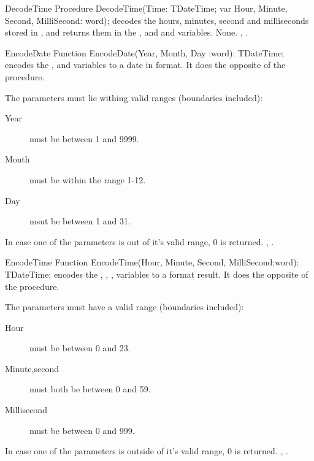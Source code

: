 


\begin{procedure}{DecodeTime}
\Declaration
Procedure DecodeTime(Time: TDateTime; var Hour, Minute, Second, MilliSecond: word);
\Description
{} decodes the hours, minutes, second and milliseconds stored
in , and returns them in the ,  and
 and  variables.
\Errors
None.
\SeeAlso
{}, .
\end{procedure}



\begin{function}{EncodeDate}
\Declaration
Function EncodeDate(Year, Month, Day :word): TDateTime;
\Description
{} encodes the ,  and  variables to
a date in  format. It does the opposite of the
 procedure.

The parameters must lie withing valid ranges (boundaries included):
\begin{description}
\item[Year] must be between 1 and 9999.
\item[Month] must be within the range 1-12.
\item[Day] msut be between 1 and 31.
\end{description}
\Errors
In case one of the parameters is out of it's valid range, 0 is returned.
\SeeAlso
{}, .
\end{function}



\begin{function}{EncodeTime}
\Declaration
Function EncodeTime(Hour, Minute, Second, MilliSecond:word): TDateTime;
\Description
{} encodes the , , ,
 variables to a  format result.
It does the opposite of the  procedure.

The parameters must have a valid range (boundaries included):
\begin{description}
\item[Hour] must be between 0 and 23.
\item[Minute,second] must both be between 0 and 59.
\item[Millisecond] must be between 0 and 999.
\end{description}
\Errors
In case one of the parameters is outside of it's valid range, 0 is returned.
\SeeAlso
{}, .
\end{function}

